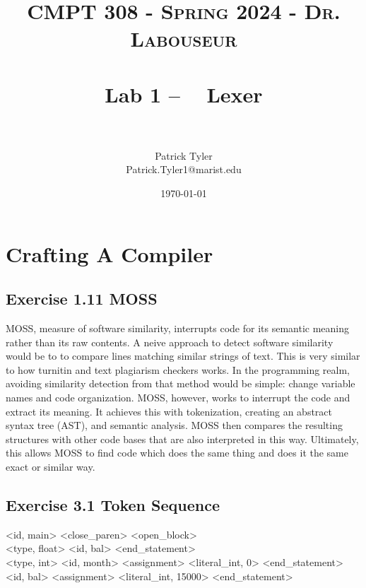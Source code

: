 \documentclass[letterpaper, 10pt]{article}
\title{	
   \normalfont \normalsize 
   \textsc{CMPT 308 - Spring 2024 - Dr. Labouseur} \\[10pt] %
   \horrule{0.5pt} \\[0.25cm] 	%
   \huge Lab 1 -- ~ Lexer\\     	    %
   \horrule{0.5pt} \\[0.25cm] 	%
}
\author{Patrick Tyler \\ \normalsize Patrick.Tyler1@marist.edu}
\date{\normalsize\today} 	%
\begin{document}
\maketitle %


\section{Crafting A Compiler}
\subsection{Exercise 1.11 MOSS}
MOSS, measure of software similarity, interrupts code for its
   semantic meaning rather than its raw contents.
A neive approach to detect software similarity would be to
   to compare lines matching similar strings of text.
This is very similar to how turnitin and text plagiarism
   checkers works.
In the programming realm, avoiding similarity detection from that
   method would be simple: change variable names and code organization.
MOSS, however, works to interrupt the code and extract its meaning.
It achieves this with tokenization, creating an abstract syntax tree
   (AST), and semantic analysis.
MOSS then compares the resulting structures with other code bases
   that are also interpreted in this way.
Ultimately, this allows MOSS to find code which does the same thing
   and does it the same exact or similar way.
\newpage
\subsection{Exercise 3.1 Token Sequence}
\textless id, main\textgreater
\textless close\_paren\textgreater
\textless open\_block\textgreater\\

\textless type, float\textgreater
\textless id, bal\textgreater
\textless end\_statement\textgreater\\

\textless type, int\textgreater
\textless id, month\textgreater
\textless assignment\textgreater
\textless literal\_int, 0\textgreater
\textless end\_statement\textgreater\\

\textless id, bal\textgreater
\textless assignment\textgreater
\textless literal\_int, 15000\textgreater
\textless end\_statement\textgreater\\
\end{document}
